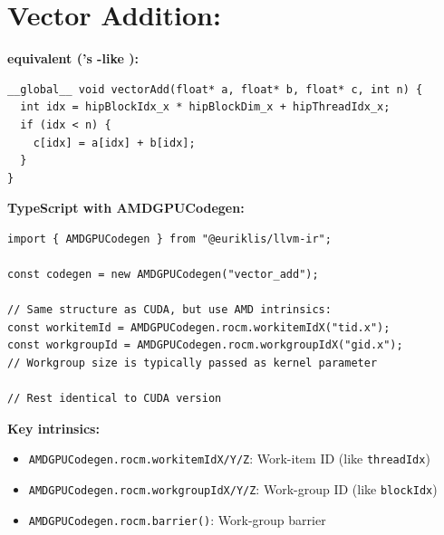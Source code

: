 \section{Vector Addition:  }

\textbf{ equivalent ('s -like ):}
\begin{lstlisting}[style=ir]
__global__ void vectorAdd(float* a, float* b, float* c, int n) {
  int idx = hipBlockIdx_x * hipBlockDim_x + hipThreadIdx_x;
  if (idx < n) {
    c[idx] = a[idx] + b[idx];
  }
}
\end{lstlisting}

\textbf{TypeScript with AMDGPUCodegen:}
\begin{lstlisting}[style=ts]
import { AMDGPUCodegen } from "@euriklis/llvm-ir";

const codegen = new AMDGPUCodegen("vector_add");

// Same structure as CUDA, but use AMD intrinsics:
const workitemId = AMDGPUCodegen.rocm.workitemIdX("tid.x");
const workgroupId = AMDGPUCodegen.rocm.workgroupIdX("gid.x");
// Workgroup size is typically passed as kernel parameter

// Rest identical to CUDA version
\end{lstlisting}

\textbf{Key  intrinsics:}
\begin{itemize}[noitemsep]
  \item \texttt{AMDGPUCodegen.rocm.workitemIdX/Y/Z}: Work-item ID (like \texttt{threadIdx})
  \item \texttt{AMDGPUCodegen.rocm.workgroupIdX/Y/Z}: Work-group ID (like \texttt{blockIdx})
  \item \texttt{AMDGPUCodegen.rocm.barrier()}: Work-group barrier
\end{itemize}

